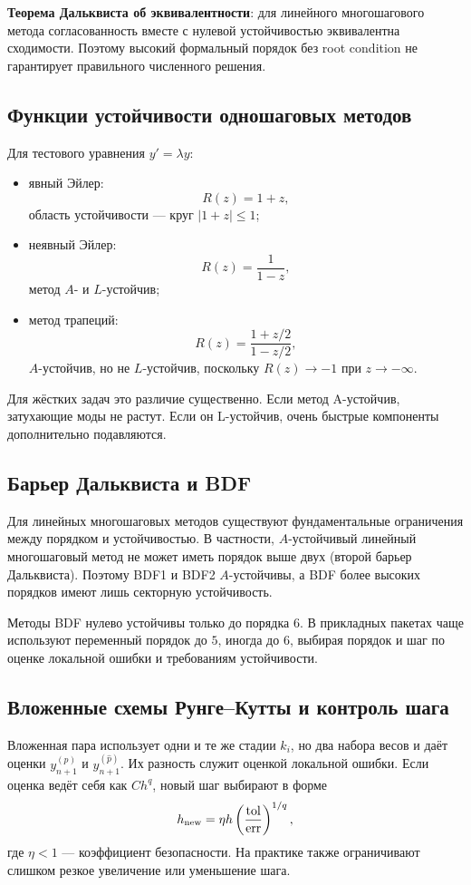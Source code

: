 \textbf{Теорема Дальквиста об эквивалентности}: для линейного многошагового метода
согласованность вместе с нулевой устойчивостью эквивалентна сходимости. Поэтому высокий
формальный порядок без root condition не гарантирует правильного численного решения.

\subsection{Функции устойчивости одношаговых методов}

Для тестового уравнения $y'=\lambda y$:
\begin{itemize}
    \item явный Эйлер:
    \[
        R(z)=1+z,
    \]
    область устойчивости --- круг $|1+z|\le1$;
    \item неявный Эйлер:
    \[
        R(z)=\frac{1}{1-z},
    \]
    метод $A$- и $L$-устойчив;
    \item метод трапеций:
    \[
        R(z)=\frac{1+z/2}{1-z/2},
    \]
    $A$-устойчив, но не $L$-устойчив, поскольку $R(z)\to-1$ при $z\to-\infty$.
\end{itemize}

Для жёстких задач это различие существенно. Если метод A-устойчив, затухающие моды
не растут. Если он L-устойчив, очень быстрые компоненты дополнительно подавляются.

\subsection{Барьер Дальквиста и BDF}

Для линейных многошаговых методов существуют фундаментальные ограничения между
порядком и устойчивостью. В частности, $A$-устойчивый линейный многошаговый метод не
может иметь порядок выше двух (второй барьер Дальквиста). Поэтому BDF1 и BDF2
$A$-устойчивы, а BDF более высоких порядков имеют лишь секторную устойчивость.

Методы BDF нулево устойчивы только до порядка $6$. В прикладных пакетах чаще используют
переменный порядок до $5$, иногда до $6$, выбирая порядок и шаг по оценке локальной
ошибки и требованиям устойчивости.

\subsection{Вложенные схемы Рунге--Кутты и контроль шага}

Вложенная пара использует одни и те же стадии $k_i$, но два набора весов и даёт оценки
$y_{n+1}^{(p)}$ и $y_{n+1}^{(\widehat p)}$. Их разность служит оценкой локальной ошибки.
Если оценка ведёт себя как $Ch^q$, новый шаг выбирают в форме
\[
    h_{\rm new}
    =\eta h
      \left(\frac{\mathrm{tol}}{\mathrm{err}}\right)^{1/q},
\]
где $\eta<1$ --- коэффициент безопасности. На практике также ограничивают слишком
резкое увеличение или уменьшение шага.

